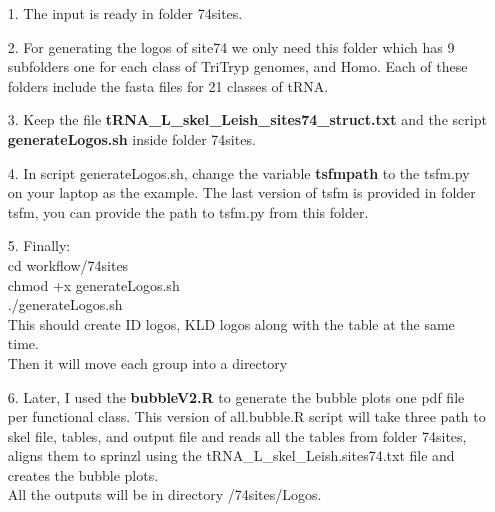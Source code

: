 \documentclass[table,
12pt, %
a4paper, %
oneside, %
headinclude,footinclude, %
BCOR5mm, %
]{scrartcl}
\begin{document}
\begin{itemize}
\item[1. ] The input is ready in folder 74sites. 
\item[2. ] For generating the logos of site74 we only need this folder which has 9 subfolders one for each class of TriTryp genomes, and Homo. Each of these folders include the fasta files for 21 classes of tRNA.\\
\item[3. ] Keep the file \textbf{tRNA\_L\_skel\_Leish\_sites74\_struct.txt} and the script \textbf{generateLogos.sh} inside folder 74sites.\\
\item[4. ] In script generateLogos.sh, change the variable \textbf{tsfmpath} to the tsfm.py on your laptop as the example. The last version of tsfm is provided in folder tsfm, you can provide the path to tsfm.py from this folder.\\
\item[5. ] Finally:\\
cd workflow/74sites\\
chmod +x generateLogos.sh\\
./generateLogos.sh\\
This should create ID logos, KLD logos along with the table at the same time.\\
Then it will move each group into a directory\\
\item[6. ] Later, I used the \textbf{bubbleV2.R} to generate the bubble plots one pdf file per functional class. This version of all.bubble.R script will take three path to skel file, tables, and output file and reads all the tables from folder 74sites, aligns them to sprinzl using the tRNA\_L\_skel\_Leish.sites74.txt file and creates the bubble plots.\\
All the outputs will be in directory /74sites/Logos.\\
\end{itemize}
 
        
\renewcommand{\refname}{\spacedlowsmallcaps{References}} %

\end{document}
